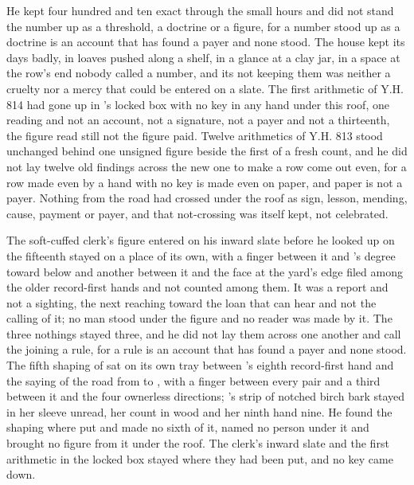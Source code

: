 He kept four hundred and ten exact through the small hours and did not stand the number up as a threshold, a doctrine or a figure, for a number stood up as a doctrine is an account that has found a payer and none stood. The house kept its days badly, in loaves pushed along a shelf, in a glance at a clay jar, in a space at the row's end nobody called a number, and its not keeping them was neither a cruelty nor a mercy that could be entered on a slate. The first arithmetic of Y.H. 814 had gone up  in 's locked box with no key in any hand under this roof, one reading and not an account, not a signature, not a payer and not a thirteenth, the figure read still not the figure paid. Twelve arithmetics of Y.H. 813 stood unchanged behind one unsigned figure beside the first of a fresh count, and he did not lay twelve old findings across the new one to make a row come out even, for a row made even by a hand with no key is made even on paper, and paper is not a payer. Nothing from the road had crossed under the roof as sign, lesson, mending, cause, payment or payer, and that not-crossing was itself kept, not celebrated.

The soft-cuffed clerk's figure entered on his inward slate before he looked up on the fifteenth stayed on a place of its own, with a finger between it and 's degree toward  below  and another between it and the face at the yard's edge filed among the older record-first hands and not counted among them. It was a report and not a sighting, the next reaching toward the loan that can hear and not the calling of it; no man stood under the figure and no reader was made by it. The three nothings stayed three, and he did not lay them across one another and call the joining a rule, for a rule is an account that has found a payer and none stood. The fifth shaping of  sat on its own tray between 's eighth record-first hand and the saying of the road from  to , with a finger between every pair and a third between it and the four ownerless directions; 's strip of notched birch bark stayed in her sleeve unread, her count in wood and her ninth hand nine. He found the shaping where put and made no sixth of it, named no person under it and brought no figure from it under the roof. The clerk's inward slate and the first arithmetic in the locked box stayed where they had been put, and no key came down.

